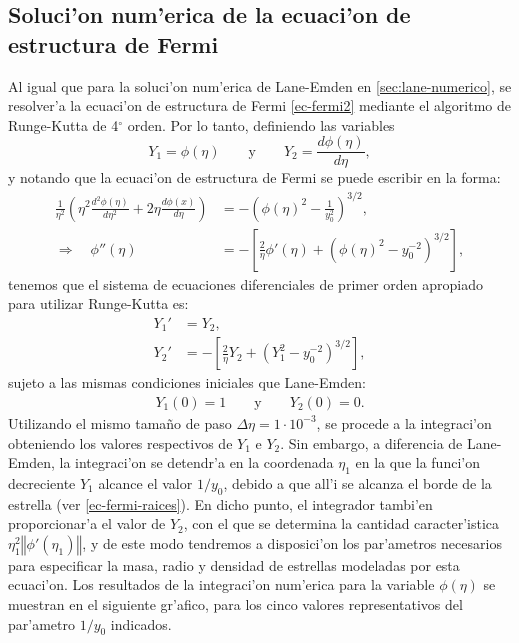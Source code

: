 \subsection{Soluci'on num'erica de la ecuaci'on de estructura de Fermi}\label{sec:fermi-numerico}
Al igual que para la soluci'on num'erica de Lane-Emden en \ref{sec:lane-numerico}, se resolver'a la ecuaci'on de estructura de Fermi \eqref{ec-fermi2} mediante el algoritmo de Runge-Kutta de 4${}^{\circ}$ orden. Por lo tanto, definiendo las variables
\begin{equation}
 Y_1=\phi(\eta)\qquad\text{y}\qquad Y_2=\frac{d\phi(\eta)}{d\eta},
\end{equation}
y notando que la ecuaci'on de estructura de Fermi se puede escribir en la forma:
\begin{align}
\frac{1}{\eta^2}\left(\eta^2\frac{d^2\phi(\eta)}{d\eta^2}+2\eta
\frac{d\phi(x)}{d\eta}\right)&=-\left(\phi(\eta)^2-\frac{1}{y_0^2}\right)^{3/2},\\
\Rightarrow\quad \phi''(\eta)&=-\left[\frac{2}{\eta}\phi'(\eta)+\left(\phi(\eta)^2-y_0^{-2}\right)^{3/2}\right],\label{ec-fermi-phi''}
\end{align}
tenemos que el sistema de ecuaciones diferenciales de primer orden apropiado para utilizar Runge-Kutta es:
\begin{equation}
\boxed{
\begin{aligned}
 Y_1'&=Y_2,\\
Y_2'&=-\left[\frac{2}{\eta}Y_2+\left(Y_1^2-y_0^{-2}\right)^{3/2}\right],
\end{aligned}}
\end{equation}
sujeto a las mismas condiciones iniciales que Lane-Emden:
\begin{align}
 Y_1(0)=1\qquad\text{y}\qquad Y_2(0)=0.
\end{align}
Utilizando el mismo tama\~no de paso $\Delta\eta=1\cdot 10^{-3}$, se procede a la integraci'on obteniendo los valores respectivos de $Y_1$ e $Y_2$. Sin embargo, a diferencia de Lane-Emden, la integraci'on se detendr'a en la coordenada $\eta_1$ en la que la funci'on decreciente $Y_1$ alcance el valor $1/y_0$, debido a que all'i se alcanza el borde de la estrella (ver \eqref{ec-fermi-raices}). En dicho punto, el integrador tambi'en proporcionar'a el valor de $Y_2$, con el que se determina la cantidad caracter'istica $\eta_1^2\left\Vert\phi'(\eta_1)\right\Vert$, y de este modo tendremos a disposici'on los par'ametros necesarios para especificar la masa, radio y densidad de estrellas modeladas por esta ecuaci'on. Los resultados de la integraci'on num'erica para la variable $\phi(\eta)$ se muestran en el siguiente gr'afico, para los cinco valores representativos del par'ametro $1/y_0$ indicados.

